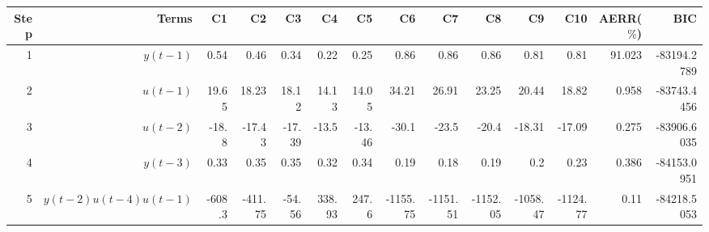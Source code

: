 \begin{tabular}{rrrrrrrrrrrrrr}
Step & Terms & C1 & C2 & C3 & C4 & C5 & C6 & C7 & C8 & C9 & C10 & AERR($\%$) & BIC \\ 
\hline 
1 & $y(t-1)$ & 0.54 & 0.46 & 0.34 & 0.22 & 0.25 & 0.86 & 0.86 & 0.86 & 0.81 & 0.81 & 91.023 & -83194.2789 \\ 
2 & $u(t-1)$ & 19.65 & 18.23 & 18.12 & 14.13 & 14.05 & 34.21 & 26.91 & 23.25 & 20.44 & 18.82 & 0.958 & -83743.4456 \\ 
3 & $u(t-2)$ & -18.8 & -17.43 & -17.39 & -13.5 & -13.46 & -30.1 & -23.5 & -20.4 & -18.31 & -17.09 & 0.275 & -83906.6035 \\ 
4 & $y(t-3)$ & 0.33 & 0.35 & 0.35 & 0.32 & 0.34 & 0.19 & 0.18 & 0.19 & 0.2 & 0.23 & 0.386 & -84153.0951 \\ 
5 & $y(t-2)u(t-4)u(t-1)$ & -608.3 & -411.75 & -54.56 & 338.93 & 247.6 & -1155.75 & -1151.51 & -1152.05 & -1058.47 & -1124.77 & 0.11 & -84218.5053 \\ 
\hline 
\end{tabular}